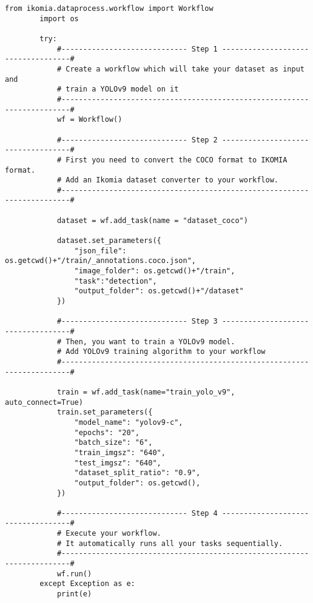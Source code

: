     \begin{lstlisting}[caption={train.py}]
        from ikomia.dataprocess.workflow import Workflow
        import os
        
        try:
            #----------------------------- Step 1 -----------------------------------#
            # Create a workflow which will take your dataset as input and
            # train a YOLOv9 model on it
            #------------------------------------------------------------------------#
            wf = Workflow()
        
            #----------------------------- Step 2 -----------------------------------#
            # First you need to convert the COCO format to IKOMIA format.
            # Add an Ikomia dataset converter to your workflow.
            #------------------------------------------------------------------------#
        
            dataset = wf.add_task(name = "dataset_coco")
        
            dataset.set_parameters({
                "json_file": os.getcwd()+"/train/_annotations.coco.json",
                "image_folder": os.getcwd()+"/train",
                "task":"detection",
                "output_folder": os.getcwd()+"/dataset"
            })
        
            #----------------------------- Step 3 -----------------------------------#
            # Then, you want to train a YOLOv9 model.
            # Add YOLOv9 training algorithm to your workflow
            #------------------------------------------------------------------------#
        
            train = wf.add_task(name="train_yolo_v9", auto_connect=True)
            train.set_parameters({
                "model_name": "yolov9-c",
                "epochs": "20",
                "batch_size": "6",
                "train_imgsz": "640",
                "test_imgsz": "640",
                "dataset_split_ratio": "0.9",
                "output_folder": os.getcwd(),
            })
        
            #----------------------------- Step 4 -----------------------------------#
            # Execute your workflow.
            # It automatically runs all your tasks sequentially.
            #------------------------------------------------------------------------#
            wf.run()
        except Exception as e:
            print(e)
    \end{lstlisting}

